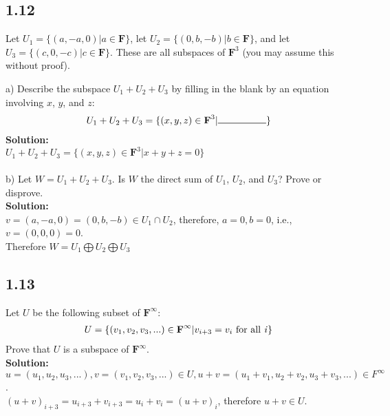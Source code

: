 \documentclass{article}
\begin{document}
\subsection{1.12}
Let $U_1=\{(a,-a,0)|a \in \textbf{F}\}$, let $U_2 = \{(0,b,-b)|b \in \textbf{F}\}$, and let $U_3 = \{(c,0,-c)|c \in \textbf{F}\}$. These are all subspaces of $\textbf{F}^3$ (you may assume this without proof).
\begin{addmargin}[1em]{0em}
    a) Describe the subspace $U_1+U_2+U_3$ by filling in the blank by an equation involving $x$, $y$, and $z$:
    \begin{align*}
        U_1+U_2+U_3 = \{(x,y,z) \in \textbf{F}^3|\rule{50pt}{0.5pt}\}
    \end{align*}
    \textbf{Solution:}\\
    $U_1+U_2+U_3 = \{(x,y,z) \in \textbf{F}^3|x+y+z = 0\}$\\\\
    b) Let $W = U_1 + U_2 + U_3$. Is $W$ the direct sum of $U_1$, $U_2$, and $U_3$? Prove or disprove.\\
    \textbf{Solution:}\\
    $v = (a, -a, 0) = (0, b, -b) \in U_1 \cap U_2$, therefore, $a = 0, b = 0$, i.e., $v = (0, 0, 0) = 0$.\\
    Therefore $W = U_1 \bigoplus U_2 \bigoplus U_3$
\end{addmargin}

\subsection{1.13}
Let $U$ be the following subset of $\textbf{F}^\infty$:
\begin{align*}
    U = \{(v_1, v_2, v_3, ...) \in \textbf{F}^\infty|v_{i+3}=v_i\textrm{ for all \textit{i}}\}
\end{align*}
Prove that $U$ is a subspace of $\textbf{F}^\infty$.\\
\textbf{Solution:}\\
$u = (u_1, u_2, u_3, ...), v = (v_1, v_2, v_3, ...) \in U, u+v = (u_1+v_1, u_2+v_2, u_3+v_3, ...) \in F^\infty$.\\
$(u+v)_{i+3} = u_{i+3} + v_{i+3} = u_i + v_i = (u+v)_i$, therefore $u+v \in U$.\\
\end{document}
